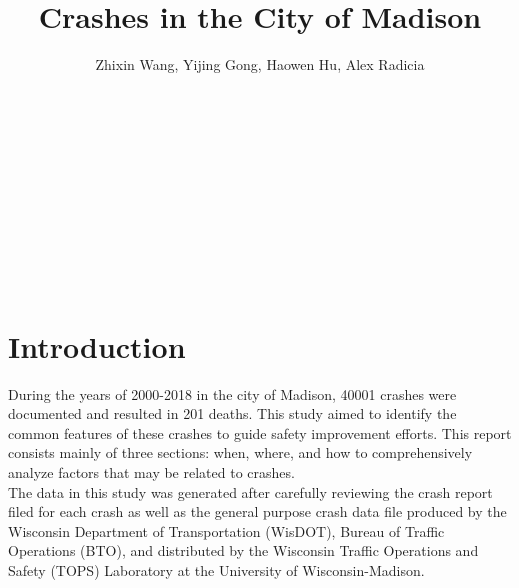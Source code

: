 \documentclass[15pt]{article}
\title{Crashes in the City of Madison}
\author{Zhixin Wang, Yijing Gong, Haowen Hu, Alex Radicia}
\date{}
\begin{document}
\maketitle

~\\
~\\
~\\
~\\
~\\
~\\
~\\
~\\
\section{Introduction}
During the years of 2000-2018 in the city of Madison, 40001 crashes were documented and resulted in 201 deaths. This study aimed to identify the common features of these crashes to guide safety improvement efforts. This report consists mainly of three sections: when, where, and how to comprehensively analyze factors that may be related to crashes.           
~\\
\newline
The data in this study was generated after carefully reviewing the crash report filed for each crash as well as the general purpose crash data file produced by the Wisconsin Department of Transportation (WisDOT), Bureau of Traffic Operations (BTO), and distributed by the Wisconsin Traffic Operations and Safety (TOPS) Laboratory at the University of Wisconsin-Madison.    

\newpage
\end{document}
